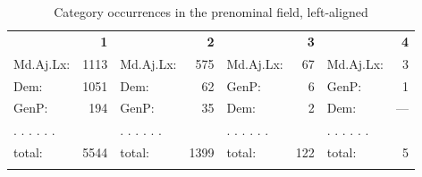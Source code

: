 \documentclass[output=paper,colorlinks,citecolor=brown,draft]{langscibook}
\begin{document}
\vfill
\begin{table}[H]
\caption{Category occurrences in the prenominal field, left-aligned }
\label{tab:probpra}
%

 \begin{tabularx}{\textwidth}{Xr Xr Xr Xr}
  \lsptoprule
  &  \textbf{1} && \textbf{2} && \textbf{3} && \textbf{4} \\
        \cmidrule(lr){1-2}\cmidrule(lr){3-4}\cmidrule(lr){5-6}\cmidrule(lr){7-8}
Md.Aj.Lx:&  1113  &  Md.Aj.Lx:&  575    & Md.Aj.Lx:&  67  &  Md.Aj.Lx:&  3      \\
    Dem:&  1051       &  Dem:&  62          & GenP:&  6       &  GenP:&  1     \\
    GenP:&  194       &  GenP:&  35         & Dem:&  2        &  Dem:&  ---     \\
    . .	. . . .     && . . . . . .	    && . . . . . .   &&. . . . . .	\\
    \cmidrule(lr){1-2}\cmidrule(lr){3-4}\cmidrule(lr){5-6}\cmidrule(lr){7-8}
    total:&  5544     &  total:&  1399      & total:&  122    & total:&  5      \\
   \lspbottomrule
 \end{tabularx}
\end{table} 
\vfill
\pagebreak
\end{document}
